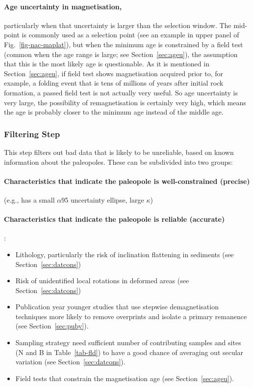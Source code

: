 \paragraph{Age uncertainty in magnetisation,}
particularly when that uncertainty is larger than the selection window. The
mid-point is commonly used as a selection point (see an example in upper panel
of Fig.~\ref{fig-nac-maplat}), but when the minimum age is constrained by a
field test (common when the age range is large; see Section~\ref{sec:ageu}), the
assumption that this is the most likely age is questionable. As it is mentioned
in Section~\ref{sec:ageu}, if field test shows magnetisation acquired prior to,
for example, a folding event that is tens of millions of years after initial
rock formation, a passed field test is not actually very useful. So age
uncertainty is very large, the possibility of remagnetisation is certainly very
high, which means the age is probably closer to the minimum age instead of the
middle age.

\subsubsection{Filtering Step}

This step filters out bad data that is likely to be unreliable, based on known
information about the paleopoles. These can be subdivided into two groups:

\paragraph{Characteristics that indicate the paleopole is well-constrained
(precise)}
(e.g., has a small $\alpha$95 uncertainty ellipse, large $\kappa$)

\paragraph{Characteristics that indicate the paleopole is reliable (accurate)}:
\begin{itemize}
  \item Lithology, particularly the risk of inclination flattening in sediments
        (see Section~\ref{sec:datcons})
  \item Risk of unidentified local rotations in deformed areas (see
        Section~\ref{sec:datcons})
  \item Publication year \textemdash{} younger studies that use stepwise
        demagnetisation techniques more likely to remove overprints and isolate
        a primary remanence (see Section~\ref{sec:puby}).
  \item Sampling strategy \textemdash{} need sufficient number of contributing
        samples and sites (N and B in Table~\ref{tab-fld}) to have a good chance
        of averaging out secular variation (see Section~\ref{sec:datcons}).
  \item Field tests that constrain the magnetisation age (see
        Section~\ref{sec:ageu}).
\end{itemize}

